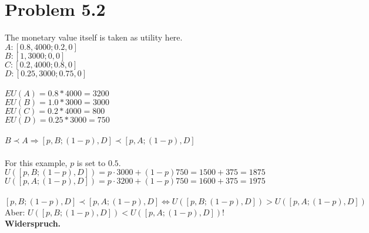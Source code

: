 \documentclass[a4paper]{article}
\begin{document}
\section*{Problem 5.2}
The monetary value itself is taken as utility here.\\
$A: [0.8, 4000; 0.2, 0]$\\
$B: [1, 3000; 0, 0]$\\
$C: [0.2, 4000; 0.8, 0]$\\
$D: [0.25, 3000; 0.75, 0]$\\
\\
$EU(A) = 0.8 * 4000 = 3200$\\ 
$EU(B) = 1.0 * 3000 = 3000$\\
$EU(C) = 0.2 * 4000 = 800$\\
$EU(D) = 0.25 * 3000 = 750$\\
\\
$B \prec A \Rightarrow  [p, B; (1-p), D] \prec [p, A; (1-p), D]$\\
\\
For this example, $p$ is set to $0.5$.\\
$U([p, B; (1-p), D]) = p\cdot 3000 + (1-p) 750 = 1500 + 375 = 1875$\\
$U([p, A; (1-p), D]) = p\cdot 3200 + (1-p) 750 = 1600 + 375 = 1975$\\
\\
$[p, B; (1-p), D] \prec [p, A; (1-p), D] \Leftrightarrow U([p, B; (1-p), D]) > U([p, A; (1-p), D])$\\
Aber: $U([p, B; (1-p), D]) < U([p, A; (1-p), D])$!\\
\textbf{Widerspruch.}\\
\end{document}
